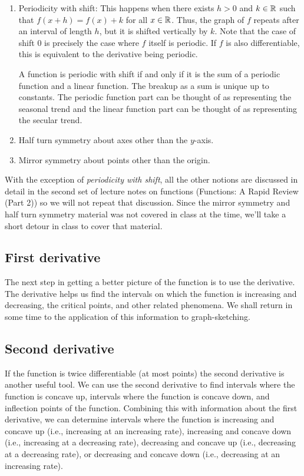 \documentclass[10pt]{amsart}
\begin{document}
\begin{enumerate}
\item Periodicity with shift: This happens when there exists $h > 0$
  and $k \in \mathbb{R}$ such that $f(x + h) = f(x) + k$ for all $x \in
  \mathbb{R}$. Thus, the graph of $f$ repeats after an interval of length $h$,
  but it is shifted vertically by $k$. Note that the case of shift $0$
  is precisely the case where $f$ itself is periodic. If $f$ is also
  differentiable, this is equivalent to the derivative being periodic.

  A function is periodic with shift if and only if it is the sum of a
  periodic function and a linear function. The breakup as a sum is
  unique up to constants. The periodic function part can be thought of
  as representing the seasonal trend and the linear function part can
  be thought of as representing the secular trend.
\item Half turn symmetry about axes other than the $y$-axis.
\item Mirror symmetry about points other than the origin.
\end{enumerate}

With the exception of {\em periodicity with shift}, all the other
notions are discussed in detail in the second set of lecture notes on
functions (Functions: A Rapid Review (Part 2)) so we will not repeat
that discussion. Since the mirror symmetry and half turn symmetry
material was not covered in class at the time, we'll take a short
detour in class to cover that material.

\subsection{First derivative}

The next step in getting a better picture of the function is to use
the derivative. The derivative helps us find the intervals on which
the function is increasing and decreasing, the critical points, and
other related phenomena. We shall return in some time to the
application of this information to graph-sketching.

\subsection{Second derivative}

If the function is twice differentiable (at most points) the second
derivative is another useful tool. We can use the second derivative to
find intervals where the function is concave up, intervals where the
function is concave down, and inflection points of the
function. Combining this with information about the first derivative,
we can determine intervals where the function is increasing and
concave up (i.e., increasing at an increasing rate), increasing and
concave down (i.e., increasing at a decreasing rate), decreasing and
concave up (i.e., decreasing at a decreasing rate), or decreasing and
concave down (i.e., decreasing at an increasing rate).
\end{document}
